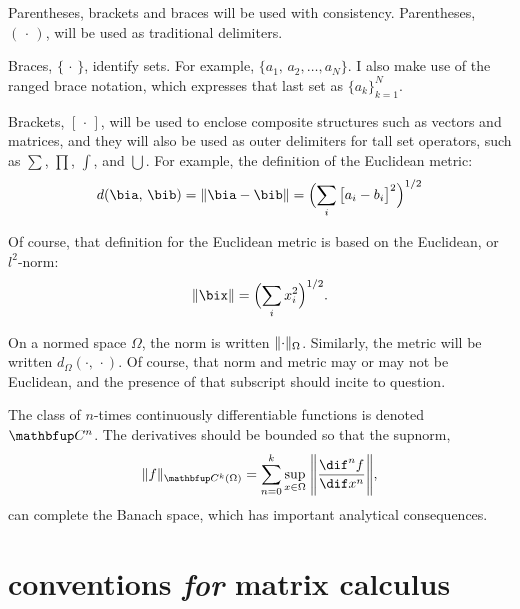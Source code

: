 Parentheses, brackets and braces will be used with consistency. Parentheses,
$(\,\cdot\,)$, will be used as traditional delimiters.

Braces, $\{\,\cdot\,\}$, identify sets. For example, $\bigl\{a_1,\,
a_2,\ldots,a_N \bigr\}$. I also make use of the ranged brace notation, which
expresses that last set as $\bigl\{a_k\bigr\}_{k=1}^N$.

Brackets, $[\,\cdot\,]$, will be used to enclose composite structures such as
vectors and matrices, and they will also be used as outer delimiters for tall
set operators, such as $\sum$, $\prod$, $\int$, and $\bigcup$. For example, the
definition of the Euclidean metric:
\begin{equation}\label{eq:Euclidean-metric}
  d(\bia,\,\bib) = \norm{\bia - \bib} = \Bigl(\sum_i\,\bigl[a_i-b_i\bigr]^2\Bigr)^{1/2}
\end{equation}

Of course, that definition for the Euclidean metric is based on the Euclidean,
or $l^2$-norm:
\begin{equation*}
  \norm{\bix} = \Bigl(\sum_i x_i^2\Bigr)^{1/2}.
\end{equation*}

On a normed space $\Omega$, the norm is written $\lVert \cdot\rVert_\Omega$.
Similarly, the metric will be written $d_\Omega(\cdot,\, \cdot)$. Of course,
that norm and metric may or may not be Euclidean, and the presence of that
subscript should incite to question.

The class of $n$-times continuously differentiable functions is denoted
$\continuouslyDifferentiable[n]$.%
 The derivatives
should be bounded so that the supnorm,
%
\begin{equation*}
  \norm{f}_{\continuouslyDifferentiable[k](\Omega)} = \sum_{n=0}^{k}\sup_{x\in\Omega}\;\Biggl\| \diff[n]{f}{x} \Biggr\|,
\end{equation*}
%
can complete the Banach space, which has important analytical consequences.

\section[Conventions \emph{for} Matrix Calculus]%
{conventions \emph{for} matrix calculus}%
\label{sec:matrix-calc}


